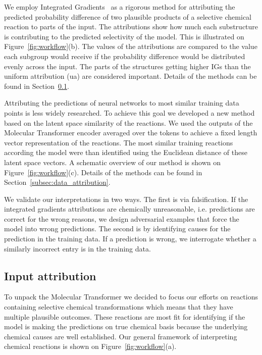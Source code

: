 We employ Integrated Gradients~\cite{Sundararajan2017} as a rigorous method for attributing the predicted probability difference of two plausible products of a selective chemical reaction to parts of the input. The attributions show how much each substructure is contributing to the predicted selectivity of the model. This is illustrated on Figure~\ref{fig:workflow}(b). The values of the attributions are compared to the value each subgroup would receive if the probability difference would be distributed evenly across the input. The parts of the structures getting higher IGs than the uniform attribution (ua) are considered important. Details of the methods can be found in Section~\ref{subsec:input_attribution}. 

Attributing the predictions of neural networks to most similar training data points is less widely researched. To achieve this goal we developed a new method based on the latent space similarity of the reactions. We used the outputs of the Molecular Transformer encoder averaged over the tokens to achieve a fixed length vector representation of the reactions. The most similar training reactions according the model were than identified using the Euclidean distance of these latent space vectors. A schematic overview of our method is shown on Figure~\ref{fig:workflow}(c). Details of the methods can be found in Section~\ref{subsec:data_attribution}.

We validate our interpretations in two ways. The first is via falsification. If the integrated gradients attributions are chemically unreasonable, i.e. predictions are correct for the wrong reasons, we design adversarial examples that force the model into wrong predictions. The second is by identifying causes for the prediction in the training data. If a prediction is wrong, we interrogate whether a similarly incorrect entry is in the training data. 

\subsection{Input attribution} \label{subsec:input_attribution}
To unpack the Molecular Transformer we decided to focus our efforts on reactions containing selective chemical transformations which means that they have multiple plausible outcomes. These reactions are most fit for identifying if the model is making the predictions on true chemical basis because the underlying chemical causes are well established. Our general framework of interpreting chemical reactions is shown on Figure~\ref{fig:workflow}(a).

